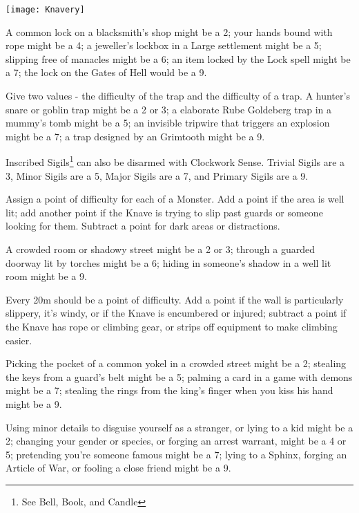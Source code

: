 {  \begin{center}
  \texttt{[image: Knavery]}
  \end{center}

  \begin{multicols}{2}

  A common lock on a blacksmith's shop might be a 2; your hands bound with rope might be a 4; a jeweller's lockbox in a Large settlement might be a 5; slipping free of manacles might be a 6;  an item locked by the Lock spell might be a 7; the lock on the Gates of Hell would be a 9.

  Give two values - the difficulty of  the trap and the difficulty of  a trap.  A hunter's snare or goblin trap might be a 2 or 3; a elaborate Rube Goldeberg trap in a mummy's tomb might be a 5; an invisible tripwire that triggers an explosion might be a 7; a trap designed by an Grimtooth might be a 9.

  Inscribed Sigils\footnote{See Bell, Book, and Candle} can also be disarmed with Clockwork Sense. Trivial Sigils are a 3, Minor Sigils are a 5, Major Sigils are a 7, and Primary Sigils are a 9.

  Assign a point of difficulty for each \HD of a Monster.  Add a point if the area is well lit; add another point if the Knave is trying to slip past guards or someone looking for them.  Subtract a point for dark areas or distractions.

  A crowded room or shadowy street might be a 2 or 3; through a guarded doorway lit by torches might be a 6; hiding in someone's shadow in a well lit room might be a 9.


  Every 20m should be a point of difficulty.  Add a point if the wall is particularly slippery, it's windy, or if the Knave is encumbered or injured; subtract a point if the Knave has rope or climbing gear, or strips off equipment to make climbing easier.

  Picking the pocket of a common yokel in a crowded street might be a 2; stealing the keys from a guard's belt might be a 5; palming a card in a game with demons might be a 7; stealing the rings from the king's finger when you kiss his hand might be a 9.

  Using minor details to disguise yourself as a stranger, or lying to a kid might be a 2; changing your gender or species, or forging an arrest warrant, might be a 4 or 5; pretending you're someone famous might be a 7; lying to a Sphinx, forging an Article of War, or fooling a close friend might be a 9.
  




\end{multicols}}

